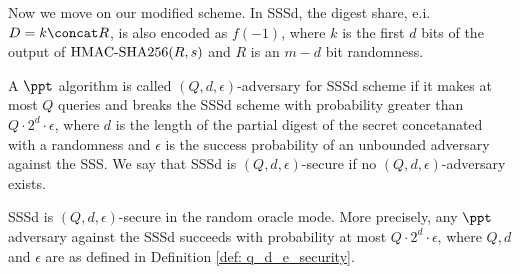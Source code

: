 \documentclass[envcountsame,runningheads,notitlepage]{llncs}
\begin{document}
	Now we move on our modified scheme. 	
	In SSSd, the digest share, e.i. $D = k \concat R$, is also encoded as $f(-1)$, where  $k$ is the first $d$ bits of the output of ${\textrm{HMAC-SHA256}}(R, s)$ and $R$ is an $m - d$ bit randomness. 
	\begin{definition} \label{def: q_d_e_security}
		A $\ppt$ algorithm is called $(Q, d, \epsilon)$-adversary for SSSd scheme if it makes at most $Q$ queries and breaks the SSSd scheme with probability greater than $Q \cdot 2^{d} \cdot \epsilon$, where $d$ is the length of the partial digest of the secret concetanated with a randomness and $\epsilon$ is the success probability of an unbounded adversary against the SSS. We say that SSSd is $(Q, d, \epsilon)$-secure if no $(Q, d, \epsilon)$-adversary exists. 
	\end{definition}
	
	\begin{theorem}
		SSSd is $(Q, d, \epsilon)$-secure in  the random oracle mode.
		More precisely, any $\ppt$ adversary against the SSSd succeeds with probability at most $Q \cdot 2^{d} \cdot \epsilon$, where $Q, d$ and $\epsilon$ are as defined in Definition \ref{def: q_d_e_security}.   
	\end{theorem}
	
\end{document}
